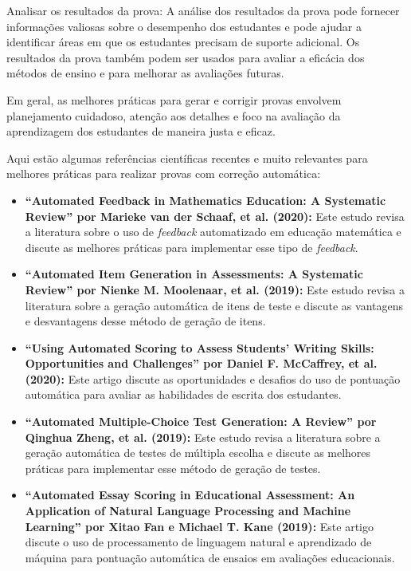 Analisar os resultados da prova: A análise dos resultados da prova pode fornecer informações valiosas sobre o desempenho dos estudantes e pode ajudar a identificar áreas em que os estudantes precisam de suporte adicional. Os resultados da prova também podem ser usados para avaliar a eficácia dos métodos de ensino e para melhorar as avaliações futuras.

Em geral, as melhores práticas para gerar e corrigir provas envolvem planejamento cuidadoso, atenção aos detalhes e foco na avaliação da aprendizagem dos estudantes de maneira justa e eficaz.

Aqui estão algumas referências científicas recentes e muito relevantes para melhores práticas para realizar provas com correção automática:

\begin{itemize}
\item \textbf{``Automated Feedback in Mathematics Education: A Systematic Review'' por Marieke van der Schaaf, et al. (2020):} Este estudo revisa a literatura sobre o uso de \textit{feedback} automatizado em educação matemática e discute as melhores práticas para implementar esse tipo de \textit{feedback}.

\item \textbf{``Automated Item Generation in Assessments: A Systematic Review'' por Nienke M. Moolenaar, et al. (2019):} Este estudo revisa a literatura sobre a geração automática de itens de teste e discute as vantagens e desvantagens desse método de geração de itens.

\item \textbf{``Using Automated Scoring to Assess Students' Writing Skills: Opportunities and Challenges'' por Daniel F. McCaffrey, et al. (2020):} Este artigo discute as oportunidades e desafios do uso de pontuação automática para avaliar as habilidades de escrita dos estudantes.

\item \textbf{``Automated Multiple-Choice Test Generation: A Review'' por Qinghua Zheng, et al. (2019):} Este estudo revisa a literatura sobre a geração automática de testes de múltipla escolha e discute as melhores práticas para implementar esse método de geração de testes.

\item \textbf{``Automated Essay Scoring in Educational Assessment: An  Application of Natural Language Processing and Machine Learning'' por Xitao Fan e Michael T. Kane (2019):} Este artigo discute o uso de processamento de linguagem natural e aprendizado de máquina para pontuação automática de ensaios em avaliações educacionais.
\end{itemize}

